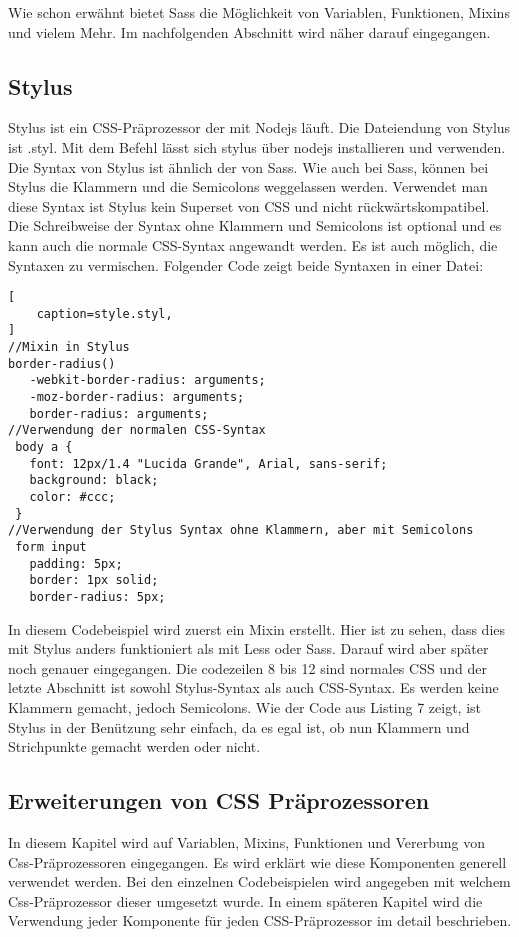 Wie schon erwähnt bietet Sass die Möglichkeit von Variablen, Funktionen, Mixins und vielem Mehr.
Im nachfolgenden Abschnitt wird näher darauf eingegangen.
\newpage
\subsection{Stylus}
Stylus ist ein CSS-Präprozessor der mit Nodejs läuft.  Die Dateiendung von Stylus ist .styl.\newline
Mit dem Befehl \glqq{} lässt sich stylus über nodejs installieren und verwenden. \newline
Die Syntax von Stylus ist ähnlich der von Sass. Wie auch bei Sass, können bei Stylus die Klammern und die Semicolons weggelassen werden.\newline
Verwendet man diese Syntax ist Stylus kein Superset von CSS und nicht rückwärtskompatibel.\newline
Die Schreibweise der Syntax ohne Klammern und Semicolons ist optional und es kann auch die normale CSS-Syntax angewandt werden.\newline
Es ist auch möglich, die Syntaxen zu vermischen. Folgender Code zeigt beide Syntaxen in einer Datei:
\begin{lstlisting}[
	caption=style.styl,
]
//Mixin in Stylus
border-radius()
   -webkit-border-radius: arguments;
   -moz-border-radius: arguments;
   border-radius: arguments;
//Verwendung der normalen CSS-Syntax
 body a {
   font: 12px/1.4 "Lucida Grande", Arial, sans-serif;
   background: black;
   color: #ccc;
 }
//Verwendung der Stylus Syntax ohne Klammern, aber mit Semicolons
 form input
   padding: 5px;
   border: 1px solid;
   border-radius: 5px;
\end{lstlisting}
\autocite[]{LearnBoost.2010}\newline

In diesem Codebeispiel wird zuerst ein Mixin erstellt. Hier ist zu sehen, dass dies mit Stylus anders funktioniert als mit Less oder Sass. Darauf wird aber später noch genauer eingegangen.\newline
Die codezeilen 8 bis 12 sind normales CSS und der letzte Abschnitt ist sowohl Stylus-Syntax als auch CSS-Syntax. Es werden keine Klammern gemacht, jedoch Semicolons.\newline
Wie der Code aus Listing 7 zeigt, ist Stylus in der Benützung sehr einfach, da es egal ist, ob nun Klammern und Strichpunkte gemacht werden oder nicht.
\subsection{Erweiterungen von CSS Präprozessoren}
In diesem Kapitel wird auf Variablen, Mixins, Funktionen und Vererbung von Css-Präprozessoren eingegangen. Es wird erklärt wie diese Komponenten generell verwendet werden. Bei den einzelnen Codebeispielen wird angegeben mit welchem Css-Präprozessor dieser umgesetzt wurde. In einem späteren Kapitel wird die Verwendung jeder Komponente für jeden CSS-Präprozessor im detail beschrieben.
